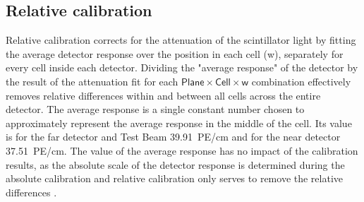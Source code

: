 \documentclass[12pt,a4paper]{article}
\begin{document}
\subsection{Relative calibration}\label{secRelativCalibration}


Relative calibration corrects for the attenuation of the scintillator light by fitting the average detector response over the position in each cell (w), separately for every cell inside each detector. Dividing the "average response" of the detector by the result of the attenuation fit for each $\textsf{Plane}\times\textsf{Cell}\times\textsf{w}$ combination effectively removes relative differences within and between all cells across the entire detector. The average response is a single constant number chosen to approximately represent the average response in the middle of the cell. Its value is for the far detector and Test Beam 39.91~PE/cm and for the near detector 37.51~PE/cm. The value of the average response has no impact of the calibration results, as the absolute scale of the detector response is determined during the absolute calibration and relative calibration only serves to remove the relative differences \cite{NOVA-doc-7410,NOVA-doc-13579-SAAttenuationAndThreshold}.
 
\end{document}
